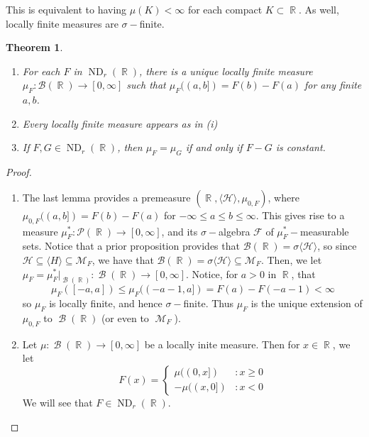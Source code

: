 \documentclass[12pt, a4paper]{memoir}
\DeclareMathOperator{\R}{{\mathbb{R}}}
\newtheorem{theorem}{Theorem}[section]
\theoremstyle{nonumberplain}
\newtheorem{proof}{Proof}
\DeclareMathOperator{\M}{\mathcal{M}}
\DeclareMathOperator{\B}{\mathcal{B}}
\DeclareMathOperator{\ND}{ND}
\begin{document}
This is equivalent to having $\mu(K)<\infty$ for each compact $K\subset\R$.
As well, locally finite measures are $\sigma-$finite.
\begin{theorem}
    \begin{enumerate}[nolistsep,label=(\roman*)]
        \item For each $F$ in $\ND_r(\R)$, there is a unique locally finite measure $\mu_F:\mathcal{B}(\R)\to[0,\infty]$ such that $\mu_F((a,b])=F(b)-F(a)$ for any finite $a,b$.
        \item Every locally finite measure appears as in (i)
        \item If $F,G\in\ND_r(\R)$, then $\mu_F=\mu_G$ if and only if $F-G$ is constant.
    \end{enumerate}
\end{theorem}
\begin{proof}
    \begin{enumerate}
        \item The last lemma provides a premeasure $(\R,\langle\mathcal{H}\rangle,\mu_{0,F})$, where $\mu_{0,F}((a,b])=F(b)-F(a)$ for $-\infty\leq a\leq b\leq\infty$. %
            This gives rise to a measure $\mu_F^*:\mathcal{P}(\R)\to[0,\infty]$, and its $\sigma-$algebra $\mathcal{F}$ of $\mu_F^*-$measurable sets.
            Notice that a prior proposition provides that $\mathcal{B}(\R)=\sigma\langle\mathcal{H}\rangle$, so since $\mathcal{H}\subseteq \langle H\rangle\subseteq\mathcal{M}_F$, we have that $\mathcal{B}(\R)=\sigma\langle\mathcal{H}\rangle\subseteq\mathcal{M}_F$.
            Then, we let $\mu_F=\mu^*_F|_{\B(\R)}:\B(\R)\to[0,\infty]$.
            Notice, for $a>0$ in $\R$, that
            \begin{equation*}
                \mu_F([-a,a])\leq \mu_F((-a-1,a])=F(a)-F(-a-1)<\infty
            \end{equation*}
            so $\mu_F$ is locally finite, and hence $\sigma-$finite.
            Thus $\mu_F$ is the unique extension of $\mu_{0,F}$ to $\B(\R)$ (or even to $\M_F$).
        \item Let $\mu:\B(\R)\to[0,\infty]$ be a locally inite measure.
            Then for $x\in\R$, we let
            \begin{equation*}
                F(x)=\begin{cases}\mu((0,x])&:x\geq 0\\-\mu((x,0])&:x<0\end{cases}
            \end{equation*}
            We will see that $F\in\ND_r(\R)$.

\end{enumerate}
\end{proof}
\end{document}
